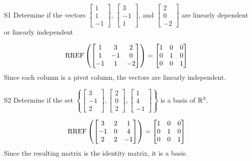\documentclass{sbgLAexam}
\begin{document}
\begin{extract}\newpage\end{extract}
\begin{problem}{S1}
Determine if the vectors $\begin{bmatrix} 1 \\ 1 \\ -1 \end{bmatrix}$, $\begin{bmatrix} 3 \\ -1 \\ 1 \end{bmatrix}$, and $\begin{bmatrix} 2 \\ 0 \\ -2 \end{bmatrix}$ are linearly dependent or linearly independent
\end{problem}
\begin{solution}
$$\operatorname{RREF}\left(\begin{bmatrix} 1 & 3 & 2 \\ 1 & -1 & 0 \\ -1 & 1 & -2 \end{bmatrix} \right)= \begin{bmatrix} 1 & 0 &0 \\ 0 & 1 & 0 \\ 0 & 0 & 1\end{bmatrix}$$
Since each column is a pivot column, the vectors are linearly independent.
\end{solution}


\begin{problem}{S2}
  Determine if the set \(\left\{
    \begin{bmatrix} 3 \\ -1 \\ 2 \end{bmatrix},
    \begin{bmatrix} 2 \\ 0 \\ 2 \end{bmatrix},
    \begin{bmatrix} 1 \\ 4 \\ -1 \end{bmatrix}
  \right\}\) is a basis of $\mathbb{R}^3$.
\end{problem}
\begin{solution}
  \[\operatorname{RREF}\left(
    \begin{bmatrix}
      3 & 2 & 1 \\
      -1 & 0 & 4 \\
      2 & 2 & -1
    \end{bmatrix} \right)= \begin{bmatrix}
      1 & 0 &0 \\
      0 & 1 & 0 \\
      0 & 0 & 1
    \end{bmatrix}
  \]
Since the resulting matrix is the identity matrix, it is a basis.
\end{solution}
\end{document}
